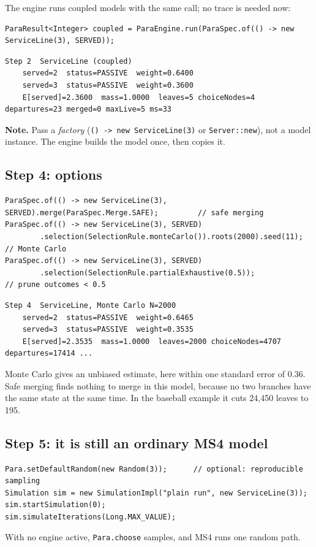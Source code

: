 \documentclass[11pt]{article}
\newcommand{\code}[1]{\texttt{#1}}
\newcommand{\note}[1]{\par\noindent\colorbox{notebg}{\parbox{\dimexpr\linewidth-2\fboxsep}{\small\textbf{Note.} #1}}\par}
\newcommand{\src}{../../src}
\begin{document}



The engine runs coupled models with the same call; no trace is needed now:
\begin{lstlisting}
ParaResult<Integer> coupled = ParaEngine.run(ParaSpec.of(() -> new ServiceLine(3), SERVED));
\end{lstlisting}
\begin{lstlisting}[style=plain]
Step 2  ServiceLine (coupled)
    served=2  status=PASSIVE  weight=0.6400
    served=3  status=PASSIVE  weight=0.3600
    E[served]=2.3600  mass=1.0000  leaves=5 choiceNodes=4 departures=23 merged=0 maxLive=5 ms=33
\end{lstlisting}

\note{Pass a \emph{factory} (\code{() -> new ServiceLine(3)} or \code{Server::new}), not a model instance. The engine
builds the model once, then copies it.}

\subsection{Step 4: options}
\begin{lstlisting}
ParaSpec.of(() -> new ServiceLine(3), SERVED).merge(ParaSpec.Merge.SAFE);         // safe merging
ParaSpec.of(() -> new ServiceLine(3), SERVED)
        .selection(SelectionRule.monteCarlo()).roots(2000).seed(11);               // Monte Carlo
ParaSpec.of(() -> new ServiceLine(3), SERVED)
        .selection(SelectionRule.partialExhaustive(0.5));                          // prune outcomes < 0.5
\end{lstlisting}
\begin{lstlisting}[style=plain]
Step 4  ServiceLine, Monte Carlo N=2000
    served=2  status=PASSIVE  weight=0.6465
    served=3  status=PASSIVE  weight=0.3535
    E[served]=2.3535  mass=1.0000  leaves=2000 choiceNodes=4707 departures=17414 ...
\end{lstlisting}
Monte Carlo gives an unbiased estimate, here within one standard error of 0.36. Safe merging finds nothing to merge in
this model, because no two branches have the same state at the same time. In the baseball example it cuts 24{,}450
leaves to 195.

\subsection{Step 5: it is still an ordinary MS4 model}
\begin{lstlisting}
Para.setDefaultRandom(new Random(3));      // optional: reproducible sampling
Simulation sim = new SimulationImpl("plain run", new ServiceLine(3));
sim.startSimulation(0);
sim.simulateIterations(Long.MAX_VALUE);
\end{lstlisting}
With no engine active, \code{Para.choose} samples, and MS4 runs one random path.
\end{document}

